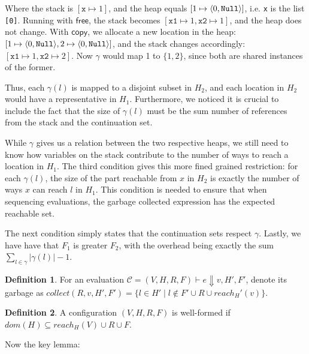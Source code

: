 \documentclass{easychair}
\newcommand{\ms}[1]{\ensuremath{\mathsf{#1}}}
\newcommand{\irl}[1]{\mathtt{#1}}
\theoremstyle{definition}
\newtheorem{definition}{Definition}[section]
\begin{document}
Where the stack is $[\texttt{x} \mapsto 1]$, and the heap equals 
$[1 \mapsto \pairexcst{0}{\irl{Null}}]$, i.e. \texttt{x} is the list \texttt{[0]}.
Running with $\ms{free}$, the stack becomes 
$[\texttt{x1} \mapsto 1,\texttt{x2} \mapsto 1]$, and the heap does not change. With 
$\ms{copy}$, we allocate a new location in the heap:
$[1 \mapsto \pairexcst{0}{\irl{Null}},2 \mapsto \pairexcst{0}{\irl{Null}}]$, and the 
stack changes accordingly: $[\texttt{x1} \mapsto 1,\texttt{x2} \mapsto 2]$.
Now $\gamma$ would map 1 to $\{1,2\}$, since both are shared instances of the former.

Thus, each $\gamma(l)$ is mapped to a disjoint subset in $H_2$, and each location in $H_2$ 
would have a representative in $H_1$. Furthermore, we noticed it is crucial to include the 
fact that the size of $\gamma(l)$ must be the sum number of references from the stack and 
the continuation set. 

While $\gamma$ gives us a relation between the two respective heaps, we still need to know 
how variables on the stack contribute to the number of ways to reach a location in $H_1$. 
The third condition gives this more fined grained restriction: for each  $\gamma(l)$, 
the size of the part reachable from $x$ in $H_2$ is exactly the number of ways $x$ can 
reach $l$ in $H_1$. This condition is needed to ensure that when sequencing evaluations, 
the garbage collected expression has the expected reachable set.

The next condition simply states that the continuation sets respect $\gamma$. Lastly, 
we have have that $F_1$ is greater $F_2$, with the overhead being exactly the sum 
$\sum_{l \in \gamma} |\gamma(l)| - 1$. 

\begin{definition}
For an evaluation $\mathcal{C} = (V,H,R,F) \vdash e \Downarrow v,H',F'$, denote its garbage as
$collect(R,v,H',F') = \{l \in H' \mid l \notin F' \cup R \cup reach_H'(v)\}$. 
\end{definition}

\begin{definition} A configuration $(V,H,R,F)$ is well-formed if 
	$dom(H) \subseteq reach_H(V) \cup R \cup F$.
\end{definition}
Now the key lemma:
\end{document}
